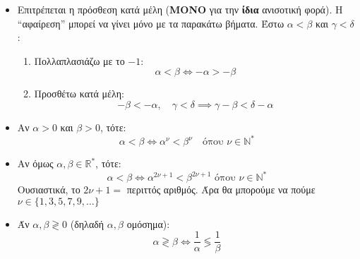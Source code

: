 \begin{itemize}[leftmargin=1em]
\begin{itemize}
        \item Επιτρέπεται η πρόσθεση κατά μέλη (\textbf{ΜΟΝΟ} για την \textbf{ίδια} ανισοτική φορά).
        Η ``αφαίρεση'' μπορεί να γίνει μόνο με τα παρακάτω βήματα. Έστω $\alpha < \beta$ και $\gamma < \delta$:

        \begin{enumerate}
            \item Πολλαπλασιάζω με το $-1$:
            \[
            \alpha < \beta \iff -\alpha > -\beta
            \]
            \item Προσθέτω κατά μέλη:
            \[
            -\beta < -\alpha, \quad \gamma < \delta \implies \gamma - \beta < \delta - \alpha
            \]
        \end{enumerate}

        \item Αν $\alpha > 0$ και $\beta > 0$, τότε:
        \[
        \alpha < \beta \iff \alpha^\nu < \beta^\nu \quad \text{όπου } \nu \in \mathbb{N}^*
        \]

        \item Αν όμως $\alpha, \beta \in \mathbb{R}^*$, τότε:
        \[
        \alpha < \beta \iff \alpha^{2\nu + 1} < \beta^{2\nu + 1} \text{ όπου } \nu \in \mathbb{N}^*
        \]
        Ουσιαστικά, το $2\nu + 1 =$ περιττός αριθμός. Άρα θα μπορούμε να πούμε $\nu \in \{1,3,5,7,9,\ldots\}$ %
        \item Άν $\alpha, \beta \gtrless 0$ (δηλαδή $\alpha,\beta$ ομόσημα):
        \[
        \alpha \gtrless \beta \iff \frac{1}{\alpha} \lessgtr \frac{1}{\beta}
        \]


    \end{itemize}

\end{itemize}
